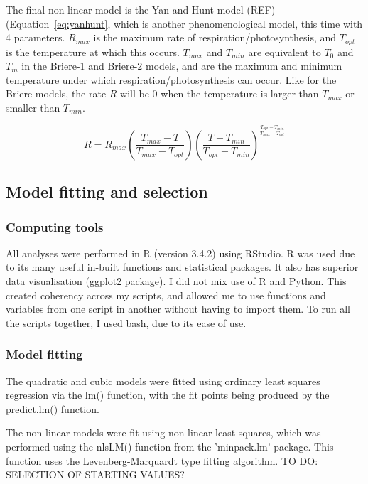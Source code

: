 \documentclass[11pt, a4paper]{article}
\begin{document}
	The final non-linear model is the Yan and Hunt model (REF) (Equation~\ref{eq:yanhunt}, which is another phenomenological model, this time with 4 parameters. $R_{max}$ is the maximum rate of respiration/photosynthesis, and $T_{opt}$ is the temperature at which this occurs. $T_{max}$ and $T_{min}$ are equivalent to $T_0$ and $T_m$ in the Briere-1 and Briere-2 models, and are the maximum and minimum temperature under which respiration/photosynthesis can occur. Like for the Briere models, the rate $R$ will be 0 when the temperature is larger than $T_{max}$ or smaller than $T_{min}$.
	
	\begin{equation} \label{eq:yanhunt}
	R = R_{max} 
		\left(
			\frac{T_{max} - T}{T_{max} - T_{opt}}
		\right) 
		\left(
			\frac{T - T_{min}}{T_{opt} - T_{min}}
		\right)
			^\frac{T_{opt} - T_{min}}{T_{max} - T_{opt}}
	\end{equation}

	\subsection{Model fitting and selection}
	\subsubsection*{Computing tools}
	All analyses were performed in R (version 3.4.2) using RStudio. R was used due to its many useful in-built functions and statistical packages. It also has superior data visualisation (ggplot2 package). I did not mix use of R and Python. This created coherency across my scripts, and allowed me to use functions and variables from one script in another without having to import them. To run all the scripts together, I used bash, due to its ease of use.
	
	\subsubsection*{Model fitting}
	The quadratic and cubic models were fitted using ordinary least squares regression via the lm() function, with the fit points being produced by the predict.lm() function.
	
	The non-linear models were fit using non-linear least squares, which was performed using the nlsLM() function from the 'minpack.lm' package. This function uses the Levenberg-Marquardt type fitting algorithm. TO DO: SELECTION OF STARTING VALUES?
	
\end{document}
